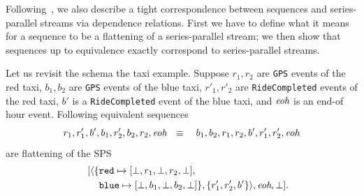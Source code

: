 Following~, we also describe a tight correspondence between sequences and series-parallel streams via dependence relations. First we have to define what it means for a sequence to be a flattening of a series-parallel stream; we then show that sequences up to equivalence exactly correspond to series-parallel streams.

\begin{example}
\label{45:ex:gps-flatten}
Let us revisit the schema the taxi example.
Suppose $r_1, r_2$ are \texttt{GPS} events of the red taxi,
$b_1, b_2$ are \texttt{GPS} events of the blue taxi,
$r'_1, r'_2$ are \texttt{RideCompleted} events of the red taxi,
$b'$ is a \texttt{RideCompleted} event of the blue taxi,
and $\textit{eoh}$ is an end-of hour event.
Following equivalent sequences
$$r_1, r'_1, b', b_1, r'_2, b_2, r_2, \textit{eoh}\ \ \equiv\ \ \
b_1, b_2, r_1, r_2, b', r'_1, r'_2, \textit{eoh}$$
are flattening of the SPS
\begin{align*}
~\qquad
[ \langle \{& {\texttt{red}}\mapsto{[\bot,r_1,\bot,r_2,\bot]}, \\
& {\texttt{blue}}\mapsto{[\bot,b_1,\bot,b_2,\bot]}\}, \{r'_1,r'_2,b'\} \rangle,
\textit{eoh}, \bot
]. \quad \end{align*}
\end{example}

